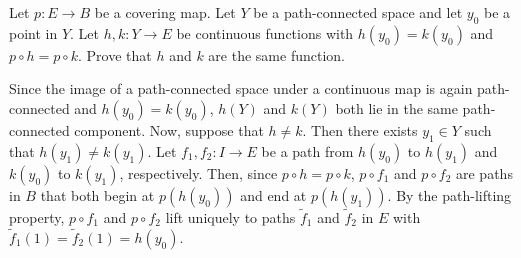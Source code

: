 \begin{problem}
  Let \(p\colon E\to B\) be a covering map. Let \(Y\) be a path-connected
  space and let \(y_0\) be a point in \(Y\). Let \(h,k\colon Y\to E\) be
  continuous functions with \(h(y_0)=k(y_0)\) and \(p\circ h=p\circ
  k\). Prove that \(h\) and \(k\) are the same function.
\end{problem}
\begin{solution}
  Since the image of a path-connected space under a continuous map is again
  path-connected and \(h(y_0)=k(y_0)\), \(h(Y)\) and \(k(Y)\) both lie in
  the same path-connected component. Now, suppose that \(h\neq k\). Then
  there exists \(y_1\in Y\) such that \(h(y_1)\neq k(y_1)\). Let
  \(f_1,f_2\colon I\to E\) be a path from \(h(y_0)\) to \(h(y_1)\) and
  \(k(y_0)\) to \(k(y_1)\), respectively. Then, since
  \(p\circ h=p\circ k\), \(p\circ f_1\) and \(p\circ f_2\) are paths in
  \(B\) that both begin at \(p(h(y_0))\) and end at \(p(h(y_1))\). By the
  path-lifting property, \(p\circ f_1\) and \(p\circ f_2\) lift uniquely to
  paths \(\tilde f_1\) and \(\tilde f_2\) in \(E\) with
  \(\tilde f_1(1)=\tilde f_2(1)=h(y_0)\).
\end{solution}

